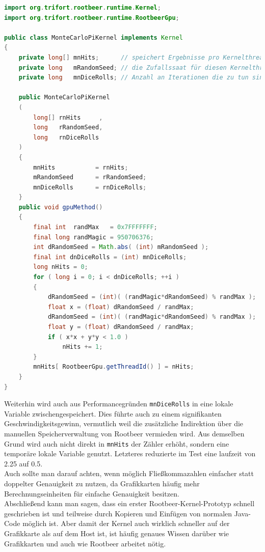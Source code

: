 \begin{lstlisting}[language=Java,caption={Implementation der Monte-Carlo-Integration für Pi},label=lst:pikernel]
import org.trifort.rootbeer.runtime.Kernel;
import org.trifort.rootbeer.runtime.RootbeerGpu;

public class MonteCarloPiKernel implements Kernel
{
    private long[] mnHits;      // speichert Ergebnisse pro Kernelthread
    private long   mRandomSeed; // die Zufallssaat für diesen Kernelthread
    private long   mnDiceRolls; // Anzahl an Iterationen die zu tun sind

    public MonteCarloPiKernel
    (
        long[] rnHits     ,
        long   rRandomSeed,
        long   rnDiceRolls
    )
    {
        mnHits           = rnHits;
        mRandomSeed      = rRandomSeed;
        mnDiceRolls      = rnDiceRolls;
    }
    public void gpuMethod()
    {
        final int  randMax   = 0x7FFFFFFF;
        final long randMagic = 950706376;
        int dRandomSeed = Math.abs( (int) mRandomSeed );
        final int dnDiceRolls = (int) mnDiceRolls;
        long nHits = 0;
        for ( long i = 0; i < dnDiceRolls; ++i )
        {
            dRandomSeed = (int)( (randMagic*dRandomSeed) % randMax );
            float x = (float) dRandomSeed / randMax;
            dRandomSeed = (int)( (randMagic*dRandomSeed) % randMax );
            float y = (float) dRandomSeed / randMax;
            if ( x*x + y*y < 1.0 )
                nHits += 1;
        }
        mnHits[ RootbeerGpu.getThreadId() ] = nHits;
    }
}
\end{lstlisting}

Weiterhin wird auch aus Performancegründen \lstinline!mnDiceRolls! in eine lokale Variable zwischengespeichert. Dies führte auch zu einem signifikanten Geschwindigkeitsgewinn, vermutlich weil die zusätzliche Indirektion über die manuellen Speicherverwaltung von Rootbeer vermieden wird. Aus demselben Grund wird auch nicht direkt in \lstinline!mnHits! der Zähler erhöht, sondern eine temporäre lokale Variable genutzt. Letzteres reduzierte im Test eine laufzeit von \SI{2.25}{\seconds} auf \SI{0.5}{\seconds}.\\

Auch sollte man darauf achten, wenn möglich Fließkommazahlen einfacher statt doppelter Genauigkeit zu nutzen, da Grafikkarten häufig mehr Berechnungseinheiten für einfache Genauigkeit besitzen.\\

Abschließend kann man sagen, dass ein erster Rootbeer-Kernel-Prototyp schnell geschrieben ist und teilweise durch Kopieren und Einfügen von normalen Java-Code möglich ist. Aber damit der Kernel auch wirklich schneller auf der Grafikkarte als auf dem Host ist, ist häufig genaues Wissen darüber wie Grafikkarten und auch wie Rootbeer arbeitet nötig.


